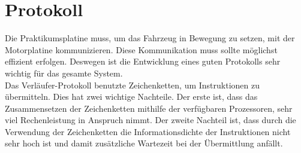 \chapter{Protokoll}
Die Praktikumsplatine muss, um das Fahrzeug in Bewegung zu setzen, mit
der Motorplatine kommunizieren. Diese Kommunikation muss sollte möglichst
effizient erfolgen. Deswegen ist die Entwicklung eines guten Protokolls
sehr wichtig für das gesamte System.\\
Das Verläufer-Protokoll benutzte Zeichenketten, um Instruktionen zu übermitteln.
Dies hat zwei wichtige Nachteile. Der erste ist, dass das Zusammensetzen der
Zeichenketten mithilfe der verfügbaren Prozessoren, sehr viel Rechenleistung in
Anspruch nimmt. Der zweite Nachteil ist, dass durch die Verwendung der Zeichenketten
die Informationsdichte der Instruktionen nicht sehr hoch ist und damit zusätzliche
Wartezeit bei der Übermittlung anfällt.

